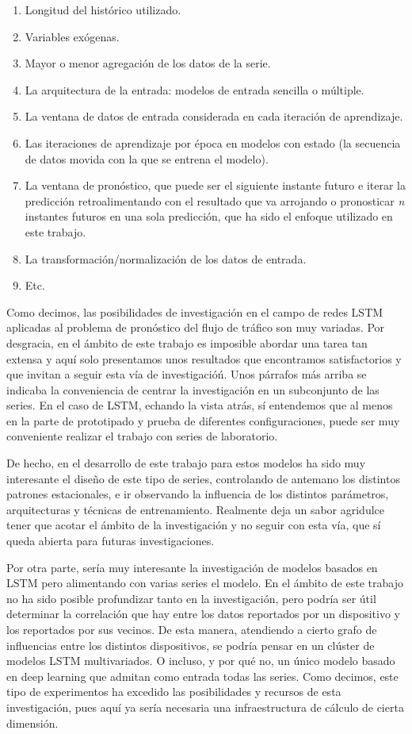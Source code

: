 \documentclass[]{book}
\begin{document}
\begin{enumerate}
\def\labelenumi{\arabic{enumi}.}
\item
  Longitud del histórico utilizado.
\item
  Variables exógenas.
\item
  Mayor o menor agregación de los datos de la serie.
\item
  La arquitectura de la entrada: modelos de entrada sencilla o múltiple.
\item
  La ventana de datos de entrada considerada en cada iteración de
  aprendizaje.
\item
  Las iteraciones de aprendizaje por época en modelos con estado (la
  secuencia de datos movida con la que se entrena el modelo).
\item
  La ventana de pronóstico, que puede ser el siguiente instante futuro e
  iterar la predicción retroalimentando con el resultado que va
  arrojando o pronosticar \emph{n} instantes futuros en una sola
  predicción, que ha sido el enfoque utilizado en este trabajo.
\item
  La transformación/normalización de los datos de entrada.
\item
  Etc.
\end{enumerate}

Como decimos, las posibilidades de investigación en el campo de redes
LSTM aplicadas al problema de pronóstico del flujo de tráfico son muy
variadas. Por desgracia, en el ámbito de este trabajo es imposible
abordar una tarea tan extensa y aquí solo presentamos unos resultados
que encontramos satisfactorios y que invitan a seguir esta vía de
investigacióń. Unos párrafos más arriba se indicaba la conveniencia de
centrar la investigación en un subconjunto de las series. En el caso de
LSTM, echando la vista atrás, sí entendemos que al menos en la parte de
prototipado y prueba de diferentes configuraciones, puede ser muy
conveniente realizar el trabajo con series de laboratorio.

De hecho, en el desarrollo de este trabajo para estos modelos ha sido
muy interesante el diseño de este tipo de series, controlando de
antemano los distintos patrones estacionales, e ir observando la
influencia de los distintos parámetros, arquitecturas y técnicas de
entrenamiento. Realmente deja un sabor agridulce tener que acotar el
ámbito de la investigación y no seguir con esta vía, que sí queda
abierta para futuras investigaciones.

Por otra parte, sería muy interesante la investigación de modelos
basados en LSTM pero alimentando con varias series el modelo. En el
ámbito de este trabajo no ha sido posible profundizar tanto en la
investigación, pero podría ser útil determinar la correlación que hay
entre los datos reportados por un dispositivo y los reportados por sus
vecinos. De esta manera, atendiendo a cierto grafo de influencias entre
los distintos dispositivos, se podría pensar en un clúster de modelos
LSTM multivariados. O incluso, y por qué no, un único modelo basado en
deep learning que admitan como entrada todas las series. Como decimos,
este tipo de experimentos ha excedido las posibilidades y recursos de
esta investigación, pues aquí ya sería necesaria una infraestructura de
cálculo de cierta dimensión.
\end{document}
